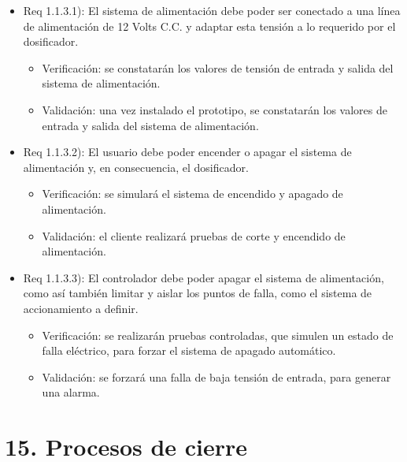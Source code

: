 \documentclass[
11pt, %
]{charter}
\begin{document}
\begin{itemize}
\item Req 1.1.3.1): El sistema de alimentación debe poder ser conectado a una línea de alimentación de 12 Volts C.C. y adaptar esta tensión a lo requerido por el dosificador.

\begin{itemize}
	\item Verificación: se constatarán los valores de tensión de entrada y salida del sistema de alimentación.
	\item Validación: una vez instalado el prototipo, se constatarán los valores de entrada y salida del sistema de alimentación.
\end{itemize}

\item Req 1.1.3.2): El usuario debe poder encender o apagar el sistema de alimentación y, en consecuencia, el dosificador.

\begin{itemize}
	\item Verificación: se simulará el sistema de encendido y apagado de alimentación.
	\item Validación: el cliente realizará pruebas de corte y encendido de alimentación.
\end{itemize}

\item Req 1.1.3.3): El controlador debe poder apagar el sistema de alimentación, como así también limitar y aislar los puntos de falla, como el sistema de accionamiento a definir.

\begin{itemize}
	\item Verificación: se realizarán pruebas controladas, que simulen un estado de falla eléctrico, para forzar el sistema de apagado automático.
	\item Validación: se forzará una falla de baja tensión de entrada, para generar una alarma.
\end{itemize}

\end{itemize}


\section{15. Procesos de cierre}    
\label{sec:cierre}
\end{document}

